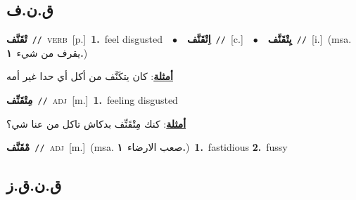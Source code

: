 \documentclass[10pt,a4paper,twoside]{article} %
\begin{document}
\begin{multicols}{2}
\vspace{-3mm}
\subsection*{\color{blue}\foreignlanguage{arabic}{ق.ن.ف}\color{blue}{}} 

{\setlength\topsep{0pt}\textbf{\foreignlanguage{arabic}{تْقَنَّف}}\ {\color{gray}\texttt{//}\color{black}}\ \textsc{verb}\ [p.]\ \textbf{1.}~feel disgusted\ \ $\bullet$\ \ \setlength\topsep{0pt}\textbf{\foreignlanguage{arabic}{اِتْقَنَّف}}\ {\color{gray}\texttt{//}\color{black}}\ [c.]\ \ $\bullet$\ \ \setlength\topsep{0pt}\textbf{\foreignlanguage{arabic}{يِتْقَنَّف}}\ {\color{gray}\texttt{//}\color{black}}\ [i.]\ \color{gray}(msa. \foreignlanguage{arabic}{يقرف من شيء}~\foreignlanguage{arabic}{\textbf{١.}})\color{black}\  \begin{flushright}\color{gray}\foreignlanguage{arabic}{\textbf{\underline{\foreignlanguage{arabic}{أمثلة}}}: كان يتكَنَّف من أكل أي حدا غير أمه}\end{flushright}\color{black}} \vspace{2mm}

{\setlength\topsep{0pt}\textbf{\foreignlanguage{arabic}{مِتْقَنِّف}}\ {\color{gray}\texttt{//}\color{black}}\ \textsc{adj}\ [m.]\ \textbf{1.}~feeling disgusted\  \begin{flushright}\color{gray}\foreignlanguage{arabic}{\textbf{\underline{\foreignlanguage{arabic}{أمثلة}}}: كنك مِتْقَنِّف بدكاش تاكل من عنا شي؟}\end{flushright}\color{black}} \vspace{2mm}

{\setlength\topsep{0pt}\textbf{\foreignlanguage{arabic}{مْقَنَّف}}\ {\color{gray}\texttt{//}\color{black}}\ \textsc{adj}\ [m.]\ \color{gray}(msa. \foreignlanguage{arabic}{صعب الارضاء}~\foreignlanguage{arabic}{\textbf{١.}})\color{black}\ \textbf{1.}~fastidious  \textbf{2.}~fussy\ } \vspace{2mm}

\vspace{-3mm}
\subsection*{\color{blue}\foreignlanguage{arabic}{ق.ن.ق.ز}\color{blue}{}} 


\end{multicols}
\end{document}
